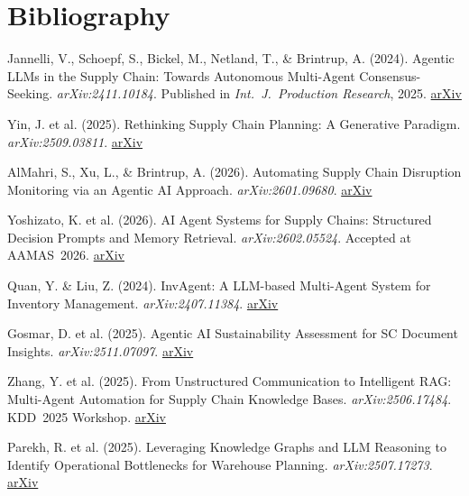 \documentclass[11pt,a4paper]{article}
\begin{document}
\section{Bibliography}

\renewcommand{\arraystretch}{1.25}
\begin{enumerate}[leftmargin=2em, itemsep=0.4em, label={[\arabic*]}]
    \item Jannelli, V., Schoepf, S., Bickel, M., Netland, T., \& Brintrup, A. (2024). Agentic LLMs in the Supply Chain: Towards Autonomous Multi-Agent Consensus-Seeking. \textit{arXiv:2411.10184}. Published in \textit{Int.\ J.\ Production Research}, 2025. \href{https://arxiv.org/abs/2411.10184}{arXiv}

    \item Yin, J. et al. (2025). Rethinking Supply Chain Planning: A Generative Paradigm. \textit{arXiv:2509.03811}. \href{https://arxiv.org/abs/2509.03811}{arXiv}

    \item AlMahri, S., Xu, L., \& Brintrup, A. (2026). Automating Supply Chain Disruption Monitoring via an Agentic AI Approach. \textit{arXiv:2601.09680}. \href{https://arxiv.org/abs/2601.09680}{arXiv}

    \item Yoshizato, K. et al. (2026). AI Agent Systems for Supply Chains: Structured Decision Prompts and Memory Retrieval. \textit{arXiv:2602.05524}. Accepted at AAMAS~2026. \href{https://arxiv.org/abs/2602.05524}{arXiv}

    \item Quan, Y. \& Liu, Z. (2024). InvAgent: A LLM-based Multi-Agent System for Inventory Management. \textit{arXiv:2407.11384}. \href{https://arxiv.org/abs/2407.11384}{arXiv}

    \item Gosmar, D. et al. (2025). Agentic AI Sustainability Assessment for SC Document Insights. \textit{arXiv:2511.07097}. \href{https://arxiv.org/abs/2511.07097}{arXiv}

    \item Zhang, Y. et al. (2025). From Unstructured Communication to Intelligent RAG: Multi-Agent Automation for Supply Chain Knowledge Bases. \textit{arXiv:2506.17484}. KDD~2025 Workshop. \href{https://arxiv.org/abs/2506.17484}{arXiv}

    \item Parekh, R. et al. (2025). Leveraging Knowledge Graphs and LLM Reasoning to Identify Operational Bottlenecks for Warehouse Planning. \textit{arXiv:2507.17273}. \href{https://arxiv.org/abs/2507.17273}{arXiv}


\end{enumerate}
\end{document}
